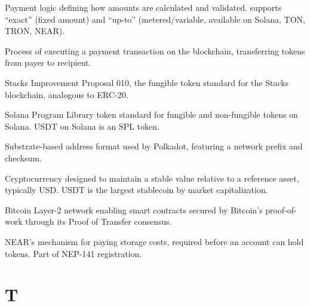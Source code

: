 \begin{description}[style=nextline]

\item[Scheme]
Payment logic defining how amounts are calculated and validated. \tprotocol{} supports ``exact'' (fixed amount) and ``up-to'' (metered/variable, available on Solana, TON, TRON, NEAR).

\item[Settlement]
Process of executing a payment transaction on the blockchain, transferring tokens from payer to recipient.

\item[SIP-010]
Stacks Improvement Proposal 010, the fungible token standard for the Stacks blockchain, analogous to ERC-20.

\item[SPL Token]
Solana Program Library token standard for fungible and non-fungible tokens on Solana. USDT on Solana is an SPL token.

\item[SS58]
Substrate-based address format used by Polkadot, featuring a network prefix and checksum.

\item[Stablecoin]
Cryptocurrency designed to maintain a stable value relative to a reference asset, typically USD. USDT is the largest stablecoin by market capitalization.

\item[Stacks]
Bitcoin Layer-2 network enabling smart contracts secured by Bitcoin's proof-of-work through its Proof of Transfer consensus.

\item[Storage Deposit]
NEAR's mechanism for paying storage costs, required before an account can hold tokens. Part of NEP-141 registration.

\end{description}

\section*{T}

